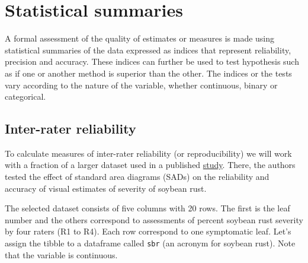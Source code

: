 \documentclass[
  letterpaper,
  DIV=11,
  numbers=noendperiod]{scrreprt}
\begin{document}
\hypertarget{statistical-summaries}{%
\section{Statistical summaries}\label{statistical-summaries}}

A formal assessment of the quality of estimates or measures is made
using statistical summaries of the data expressed as indices that
represent reliability, precision and accuracy. These indices can further
be used to test hypothesis such as if one or another method is superior
than the other. The indices or the tests vary according to the nature of
the variable, whether continuous, binary or categorical.

\hypertarget{inter-rater-reliability}{%
\subsection{Inter-rater reliability}\label{inter-rater-reliability}}

To calculate measures of inter-rater reliability (or reproducibility) we
will work with a fraction of a larger dataset used in a published
\href{https://bsppjournals.onlinelibrary.wiley.com/doi/abs/10.1111/ppa.13148}{study}.
There, the authors tested the effect of standard area diagrams (SADs) on
the reliability and accuracy of visual estimates of severity of soybean
rust.

The selected dataset consists of five columns with 20 rows. The first is
the leaf number and the others correspond to assessments of percent
soybean rust severity by four raters (R1 to R4). Each row correspond to
one symptomatic leaf. Let's assign the tibble to a dataframe called
\texttt{sbr} (an acronym for soybean rust). Note that the variable is
continuous.
\end{document}
